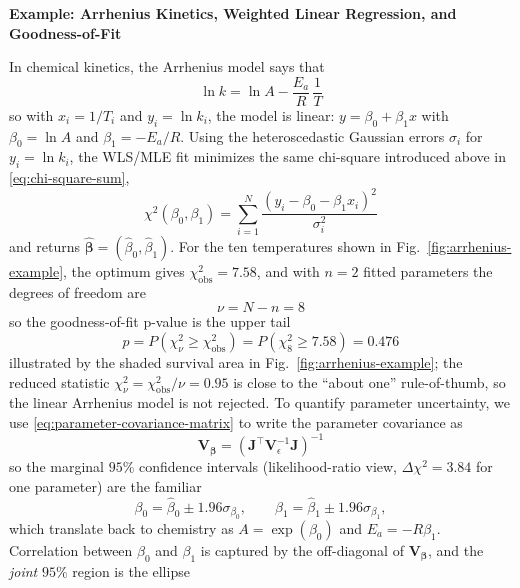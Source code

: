 \begin{exampleBox}
    \textbf{Example: Arrhenius Kinetics, Weighted Linear Regression, and Goodness-of-Fit} 
    
    In chemical kinetics, the Arrhenius model says that
    \begin{equation} 
        \ln k = \ln A - \dfrac{E_a}{R}\,\dfrac{1}{T}
    \end{equation}
    so with $x_i=1/T_i$ and $y_i=\ln k_i$, the model is linear: $y=\beta_0+\beta_1 x$ with $\beta_0=\ln A$ and $\beta_1=-E_a/R$. Using the heteroscedastic Gaussian errors $\sigma_i$ for $y_i=\ln k_i$, the WLS/MLE fit minimizes the same chi-square introduced above in \autoref{eq:chi-square-sum}, 
    \begin{equation}
        \chi^2(\beta_0,\beta_1)=\sum_{i=1}^{N}\frac{(y_i-\beta_0-\beta_1 x_i)^2}{\sigma_i^2}
    \end{equation}
    and returns $\hat{\boldsymbol\beta}=(\hat\beta_0,\hat\beta_1)$. For the ten temperatures shown in Fig.~\ref{fig:arrhenius-example}, the optimum gives $\chi^2_{\mathrm{obs}}=7.58$, and with $n=2$ fitted parameters the degrees of freedom are 
    \begin{equation}
        \nu=N-n=8
    \end{equation}
    so the goodness-of-fit p-value is the upper tail
    \begin{equation}
        p = P\left(\chi^2_{\nu}\ge \chi^2_{\mathrm{obs}}\right) = P\left(\chi^2_{8}\ge 7.58\right)=0.476
    \end{equation}
    illustrated by the shaded survival area in Fig.~\ref{fig:arrhenius-example}; the reduced statistic $\chi^2_\nu=\chi^2_{\mathrm{obs}}/\nu=0.95$ is close to the ``about one'' rule-of-thumb, so the linear Arrhenius model is not rejected. To quantify parameter uncertainty, we use \autoref{eq:parameter-covariance-matrix} to write the parameter covariance as
    \begin{equation}
        \mathbf{V}_{\boldsymbol\beta}=\left(\mathbf{J}^\top \mathbf{V}_\epsilon^{-1}\mathbf{J}\right)^{-1}
    \end{equation}
    so the marginal $95\%$ confidence intervals (likelihood-ratio view, $\Delta\chi^2=3.84$ for one parameter) are the familiar
    \begin{equation}
        \beta_0=\hat\beta_0\pm 1.96\sigma_{\beta_0}, \qquad 
        \beta_1=\hat\beta_1\pm 1.96\sigma_{\beta_1},
    \end{equation}
    which translate back to chemistry as $A=\exp(\beta_0)$ and $E_a=-R\beta_1$. Correlation between $\beta_0$ and $\beta_1$ is captured by the off-diagonal of $\mathbf{V}_{\boldsymbol\beta}$, and the \emph{joint} $95\%$ region is the ellipse

\end{exampleBox}
